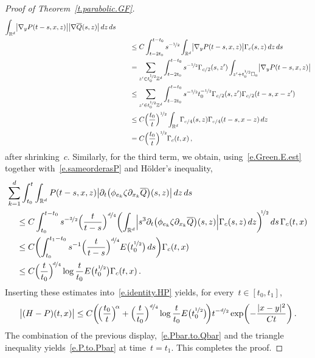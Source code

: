 \documentclass[11pt,twoside]{article} %
\let\oldsquare\square %
\renewcommand{\square}{\oldsquare}
\numberwithin{equation}{section}
\theoremstyle{definition}
\newcommand*{\Z}{\ensuremath{\mathbb{Z}}}
\newcommand*{\R}{\ensuremath{\mathbb{R}}}
\newcommand*{\Rd}{\ensuremath{\mathbb{R}^d}}
\newcommand{\cu}{\square}
\begin{document}
\begin{proof}[{Proof of Theorem~\ref{t.parabolic.GF}}]
\begin{align*}
{\int_{\Rd} 
\bigl| \nabla_y P(t-s,x,z) \bigr| \bigl| \nabla\overline{Q}(s,z) \bigr| \,dz\,ds
}
\qquad & 
\notag \\ 
& 
\leq
C \int_{t-2t_0}^{t - t_0}  s^{-\nicefrac12} \int_{\Rd} 
\bigl| \nabla_y P(t-s,x,z) \bigr| \Gamma_c(s,z)  \,dz\,ds
\notag \\ 
&  
= 
\sum_{z' \in t_0^{\nicefrac12}\Z^d} 
\int_{t-2t_0}^{t - t_0}  s^{-\nicefrac12} 
\Gamma_{c/2}(s,z') \int_{z' + t_0^{\nicefrac12} \cu_0} \bigl| \nabla_y P(t-s,x,z) \bigr|
\notag \\ 
&  
\leq 
\sum_{z' \in t_0^{\nicefrac12}\Z^d} 
\int_{t-2t_0}^{t - t_0}  s^{-\nicefrac12} t_0^{-\nicefrac12}  \Gamma_{c/2}(s,z') 
\Gamma_{c/2}(t-s,x-z')
\notag \\ 
&  
\leq 
C \Bigl( \frac{t_0}{t} \Bigr)^{\nicefrac12} \int_{\R^d} \Gamma_{c/4}(s,z) \Gamma_{c/4}(t-s,x-z)\, dz 
\notag \\ 
&  
= 
C \Bigl( \frac{t_0}{t} \Bigr)^{\nicefrac12} \Gamma_c(t,x) \,,
\end{align*}
after shrinking~$c$. Similarly, for the third term, we obtain, using~\eqref{e.Green.E.est} together with~\eqref{e.sameorderasP} and H\"older's inequality, 
\begin{align*}
\lefteqn{
\sum_{k=1}^d
\int_{t_0}^{t}
\int_{\Rd}
P(t-s,x,z) \bigl| \partial_t \bigl( \phi_{e_k} \zeta \partial_{x_k}  \overline{Q}\bigr)(s,z)\bigr| 
\,dz\,ds
} \quad & 
\\ & 
\leq
C
\int_{t_0}^{t - t_0}
s^{-\nicefrac 32}
\Bigl( \frac{t}{t-s} \Bigr)^{\nicefrac d4} 
\biggl( 
\int_{\Rd} 
\Bigl| s^3 \partial_t \bigl( \phi_{e_k} \zeta \partial_{x_k}  \overline{Q}\bigr)(s,z)  \Bigr|
\Gamma_c(s,z)
\,dz
\biggr)^{\!\!\nicefrac12 }   
\, ds \,
\Gamma_c(t,x)
\notag \\ & 
\leq 
C  \biggl(  \int_{t_0}^{t_1-t_0} s^{-1}
\Bigl( \frac{t}{t-s} \Bigr)^{\nicefrac d4} E\bigl(t_0^{\nicefrac12}\bigr)   \, ds  \biggr)  \Gamma_c(t,x) 
\notag \\ & 
\leq 
C \Bigl( \frac{t}{t_0} \Bigr)^{\!\nicefrac d4} \log \frac{t}{t_0} 
E\bigl(t_0^{\nicefrac12}\bigr) 
\Gamma_c(t,x) 
\,.
\end{align*}
Inserting these estimates into~\eqref{e.identity.HP} yields, for every~$t \in [t_0,t_1]$,
\begin{equation*}
\bigl | (H-P)(t,x) \bigr |
\leq
C\biggl( \!
\Bigl( \frac{t_0}{t} \Bigr)^{\! \alpha}
+
\Bigl( \frac{t}{t_0} \Bigr)^{\nicefrac d4} \log \frac{t}{t_0}  
E\bigl(t_0^{\nicefrac12}\bigr) \!
\biggr)
t^{-\nicefrac d2} \exp \biggl( -\frac{|x-y|^2}{Ct} \biggr)
\,.
\end{equation*}
The combination of the previous display,~\eqref{e.Pbar.to.Qbar} and the triangle inequality yields~\eqref{e.P.to.Pbar} at time~$t=t_1$. This completes the proof.
\end{proof}
\end{document}
